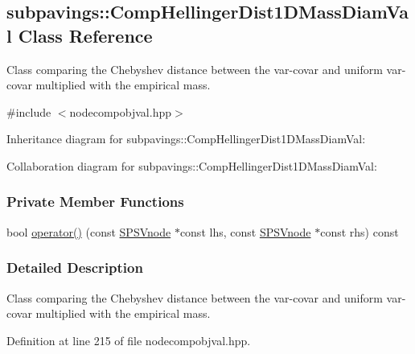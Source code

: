 \hypertarget{classsubpavings_1_1CompHellingerDist1DMassDiamVal}{\subsection{subpavings\-:\-:\-Comp\-Hellinger\-Dist1\-D\-Mass\-Diam\-Val \-Class \-Reference}
\label{classsubpavings_1_1CompHellingerDist1DMassDiamVal}
}


\-Class comparing the \-Chebyshev distance between the var-\/covar and uniform var-\/covar multiplied with the empirical mass.  




{\ttfamily \#include $<$nodecompobjval.\-hpp$>$}



\-Inheritance diagram for subpavings\-:\-:\-Comp\-Hellinger\-Dist1\-D\-Mass\-Diam\-Val\-:


\-Collaboration diagram for subpavings\-:\-:\-Comp\-Hellinger\-Dist1\-D\-Mass\-Diam\-Val\-:
\subsubsection*{\-Private \-Member \-Functions}
\begin{DoxyCompactItemize}
\item 
bool \hyperlink{classsubpavings_1_1CompHellingerDist1DMassDiamVal_a7247b4ada993f383160cf547644df465}{operator()} (const \hyperlink{classsubpavings_1_1SPSVnode}{\-S\-P\-S\-Vnode} $\ast$const lhs, const \hyperlink{classsubpavings_1_1SPSVnode}{\-S\-P\-S\-Vnode} $\ast$const rhs) const 
\end{DoxyCompactItemize}


\subsubsection{\-Detailed \-Description}
\-Class comparing the \-Chebyshev distance between the var-\/covar and uniform var-\/covar multiplied with the empirical mass. 

\-Definition at line 215 of file nodecompobjval.\-hpp.




